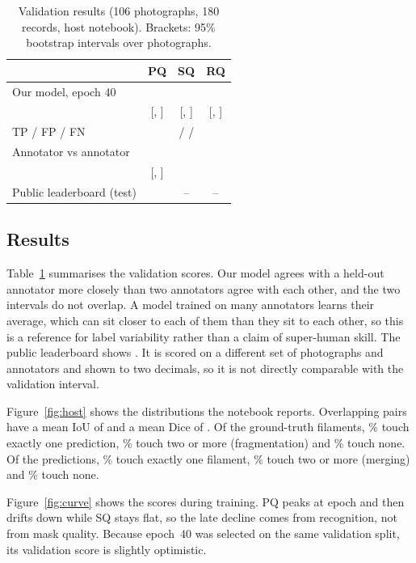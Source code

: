 \documentclass[sigconf]{acmart}
\begin{document}
\begin{table}[t]
\caption{Validation results (106 photographs, 180 records, host notebook). Brackets:
95\% bootstrap intervals over photographs.}
\label{tab:results}
\small
\setlength{\tabcolsep}{3pt}
\newcommand{\ci}[2]{{\scriptsize[#1, #2]}}
\begin{tabular}{@{}lccc@{}}
\toprule
 & PQ & SQ & RQ \\
\midrule
Our model, epoch 40 & \HostPQ{} & \ValSQ{} & \ValRQ{} \\
 & \ci{\PQLow}{\PQHigh} & \ci{\SQLow}{\SQHigh} & \ci{\RQLow}{\RQHigh} \\
\quad TP / FP / FN & \multicolumn{3}{c}{\NumTP{} / \NumFP{} / \NumFN{}} \\
Annotator vs annotator & \HumanPQ{} & \HumanSQ{} & \HumanRQ{} \\
 & \ci{\HumanPQLow}{\HumanPQHigh} & & \\
\midrule
Public leaderboard (test) & \BestPublic{} & -- & -- \\
\bottomrule
\end{tabular}
\end{table}

\subsection{Results}
Table~\ref{tab:results} summarises the validation scores. Our model agrees with a held-out
annotator more closely than two annotators agree with each other, and the two
intervals do not overlap. A model trained on many annotators learns their average,
which can sit closer to each of them than they sit to each other, so this is a
reference for label variability rather than a claim of super-human skill. The
public leaderboard shows \BestPublic{}. It is scored on a different set of photographs
and annotators and shown to two decimals, so it is not directly comparable with the
validation interval.


Figure~\ref{fig:host} shows the distributions the notebook reports. Overlapping pairs
have a mean IoU of \MeanIoUOverlap{} and a mean Dice of \MeanDiceOverlap{}. Of the
ground-truth filaments, \GTOneOnePct{}\% touch exactly one prediction,
\GTSplitPct{}\% touch two or more (fragmentation) and \GTMissedPct{}\% touch none. Of the
predictions, \PredOneOnePct{}\% touch exactly one filament, \PredMergePct{}\% touch two
or more (merging) and \PredUnmatchedPct{}\% touch none.


Figure~\ref{fig:curve} shows the scores during training. PQ peaks at epoch
\BestEpoch{} and then drifts down while SQ stays flat, so the late decline comes from
recognition, not from mask quality. Because epoch~40 was selected on the same
validation split, its validation score is slightly optimistic.
\end{document}
